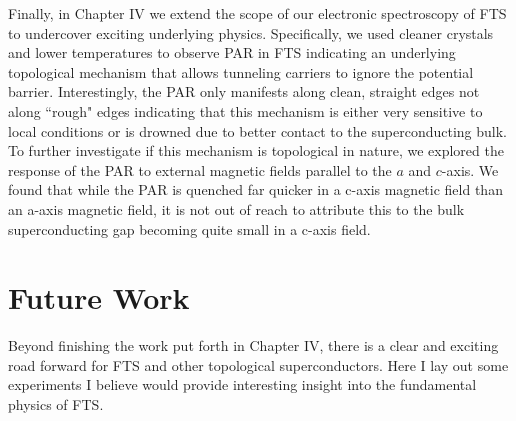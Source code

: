 Finally, in Chapter IV we extend the scope of our electronic spectroscopy of \ac{FTS} to undercover exciting underlying physics. Specifically, we used cleaner crystals and lower temperatures to observe \acl{PAR} in \ac{FTS} indicating an underlying topological mechanism that allows tunneling carriers to ignore the potential barrier. Interestingly, the \ac{PAR} only manifests along clean, straight edges not along ``rough" edges indicating that this mechanism is either very sensitive to local conditions or is drowned due to better contact to the superconducting bulk. To further investigate if this mechanism is topological in nature, we explored the response of the \ac{PAR} to external magnetic fields parallel to the $a$ and $c$-axis. We found that while the \ac{PAR} is quenched far quicker in a c-axis magnetic field than an a-axis magnetic field, it is not out of reach to attribute this to the bulk superconducting gap becoming quite small in a c-axis field.

\section{Future Work}
Beyond finishing the work put forth in Chapter IV, there is a clear and exciting road forward for \ac{FTS} and other topological superconductors. Here I lay out some experiments I believe would provide interesting insight into the fundamental physics of \ac{FTS}.
